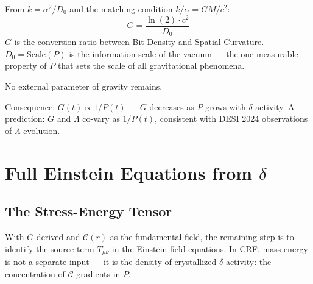 \documentclass[12pt]{article}
\begin{document}
\begin{derivedbox}
From $k = \alpha^2/D_0$ and the matching condition
$k/\alpha = GM/c^2$:
\[
  \boxed{G = \frac{\ln(2) \cdot c^2}{D_0}}
\]
$G$ is the conversion ratio between Bit-Density and Spatial
Curvature. $D_0 = \mathrm{Scale}(P)$ is the
information-scale of the vacuum --- the one measurable property
of $P$ that sets the scale of all gravitational phenomena.

No external parameter of gravity remains.

Consequence: $G(t) \propto 1/P(t)$ --- $G$ decreases as $P$
grows with $\delta$-activity. A prediction: $G$ and $\Lambda$
co-vary as $1/P(t)$, consistent with DESI 2024 observations of
$\Lambda$ evolution.
\end{derivedbox}

\section{Full Einstein Equations from $\delta$}

\subsection{The Stress-Energy Tensor}

With $G$ derived and $\mathcal{C}(r)$ as the fundamental field,
the remaining step is to identify the source term $T_{\mu\nu}$
in the Einstein field equations. In CRF, mass-energy is not a
separate input --- it is the density of crystallized
$\delta$-activity: the concentration of $\mathcal{C}$-gradients
in $P$.
\end{document}
